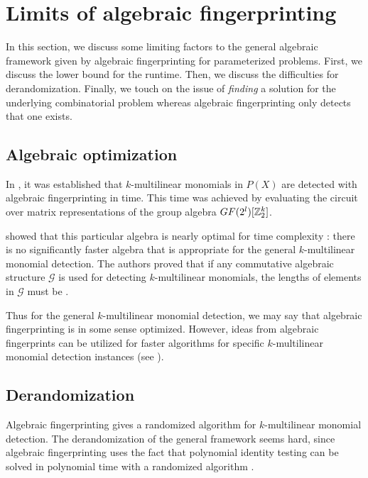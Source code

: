 \section{Limits of algebraic fingerprinting}
\label{sect:limits}

In this section, we discuss some limiting factors to the general 
algebraic framework given by 
algebraic fingerprinting for parameterized problems. First, 
we discuss the lower bound for the runtime. Then, we discuss 
the difficulties for derandomization. Finally, we touch on the issue of 
\emph{finding} a solution for the underlying combinatorial problem 
whereas algebraic fingerprinting only detects that one exists.

\subsection{Algebraic optimization}
\label{sect:algebra_is_optimal}

In , it was established that $k$-multilinear monomials 
in $P(X)$ are detected with 
algebraic fingerprinting in  time. 
This time was achieved by evaluating the circuit over matrix 
representations of the group algebra $GF(2^l)[\mathbb Z_2^k]$.

\citeauthor{KouWil09} showed that this particular algebra is nearly optimal 
for time complexity \cite{KouWil09}: there is no significantly faster algebra that 
is appropriate for the general $k$-multilinear monomial detection. 
The authors proved that if any commutative algebraic structure $\mathcal{G}$ is 
used for detecting $k$-multilinear monomials, 
the lengths of elements in $\mathcal{G}$ must be .

Thus for the general $k$-multilinear monomial detection, we may say 
that algebraic fingerprinting is in some sense optimized. 
However, 
ideas from algebraic fingerprints can be utilized for faster algorithms for 
specific $k$-multilinear monomial detection instances (see ).

\subsection{Derandomization}
\label{sect:derandomization}

Algebraic fingerprinting gives a randomized algorithm for $k$-multilinear monomial detection. 
The derandomization of the general framework seems hard, since algebraic fingerprinting 
uses the fact that polynomial identity testing can be solved in polynomial time with 
a randomized algorithm \cite{Williams09}.

